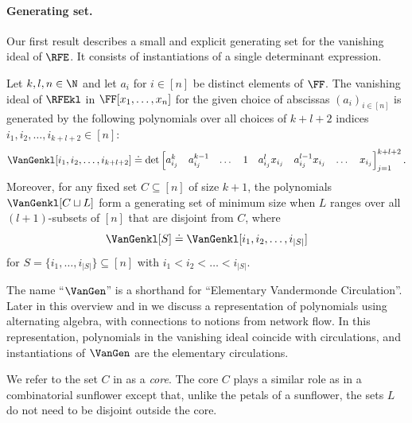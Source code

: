 \documentclass{toc}
\begin{document}
\paragraph{Generating set.}
Our first result describes a small and explicit generating set for the
vanishing ideal of $\RFE$.
It consists of instantiations of a single determinant expression.
\begin{theorem}\label{thm.ideal.generators}
  Let $k, l, n \in \N$ and let $a_i$ for $i \in [n]$ be distinct elements of $\FF$.
  The vanishing ideal of $\RFEkl$ in $\FF[x_1,\dots,x_n]$ for the
  given choice of abscissas $(a_i)_{i\in[n]}$ is generated by the following
  polynomials over all choices of $k+l+2$ indices
  $i_1, i_2, \dots, i_{k+l+2} \in [n]$:
  \begin{equation}\label{eq.def.gen}
    \VanGenkl[i_1,i_2, \dots, i_{k+l+2}]
    \doteq \det
      \begin{bmatrix}
        a_{i_j}^{k} & a_{i_j}^{k-1} & \dots & 1 &
        a_{i_j}^l x_{i_j} & a_{i_j}^{l-1}x_{i_j} & \dots & x_{i_j}
      \end{bmatrix}_{j=1}^{k+l+2}.
  \end{equation}
  Moreover,
  for any fixed set $C \subseteq [n]$ of size $k+1$, the polynomials $\VanGenkl[C \sqcup L]$
  form a generating set of minimum size when $L$ ranges over all $(l+1)$-subsets of $[n]$ that are disjoint from $C$, where 
  \[\VanGenkl[S] \doteq \VanGenkl[i_1,i_2,\dots,i_{|S|}]\] 
  for $S = \{i_1, \dots, i_{|S|}\} \subseteq [n]$ with $i_1 < i_2 < \dots < i_{|S|}$.
 \end{theorem}
The name ``\(\VanGen\)'' is a shorthand for ``Elementary Vandermonde
Circulation''.
Later in this overview and in  we discuss a representation of polynomials using alternating algebra,
with connections to notions from network flow.
In this representation, polynomials in the vanishing ideal coincide with
circulations,
and instantiations of \(\VanGen\) are the elementary circulations.

We refer to the set $C$ in  as a
\emph{core}.
The core $C$ plays a similar role as in a combinatorial sunflower except that,
unlike the petals of a sunflower,
the sets $L$ do not need to be disjoint outside the
core.
\end{document}
